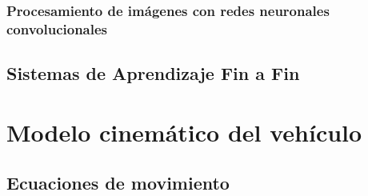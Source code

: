         \subsubsection{Procesamiento de imágenes con redes neuronales convolucionales}

    \subsection{Sistemas de Aprendizaje Fin a Fin}



\section{Modelo cinemático del vehículo}

    \subsection{Ecuaciones de movimiento}


